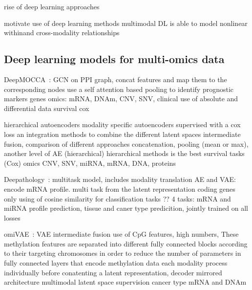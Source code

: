 \documentclass[../main.tex]{subfiles}
\begin{document}
		rise of deep learning approaches

		motivate use of deep learning methods
		multimodal DL is able to model nonlinear withinand cross-modality relationships
	\subsection{Deep learning models for multi-omics data}

		DeepMOCCA~\cite{Althubaiti_2021}: GCN on PPI graph, concat features and map them to the corresponding nodes
		use a self attention based pooling to identify prognostic markers genes
		omics: mRNA, DNAm, CNV, SNV, clinical
		use of absolute and differential data
		survival cox

		\cite{Wissel2021} hierarchical autoencoders
		modality specific autoencoders supervised with a cox loss
		an integration methods to combine the different latent spaces
		intermediate fusion, comparison of different approaches
		concatenation, pooling (mean or max), another level of AE (hierarchical)
		hierarchical methods is the best
		survival tasks (Cox)
		omics CNV, SNV, miRNA, mRNA, DNA, proteins

		Deepathology~\cite{Azarkhalili2019}: multitask model, includes modality translation
		AE and VAE: encode mRNA profile.
		multi task from the latent representation
		coding genes only
		using of cosine similarity for classification tasks ??
		4 tasks: mRNA and miRNA profile prediction, tissue and caner type predicition, jointly trained on all losses

		omiVAE~\cite{Zhang2019}: VAE intermediate fusion
		use of CpG features, high numbers,
		These methylation
		features are separated into different fully connected blocks
		according to their targeting chromosomes in order to reduce
		the number of parameters in fully connected layers that encode
		methylation data
		each modality process individually before conatenting a latent representation, decoder mirrored architecture
		multimodal latent space supervision cancer type
		mRNA and DNAm
\end{document}
